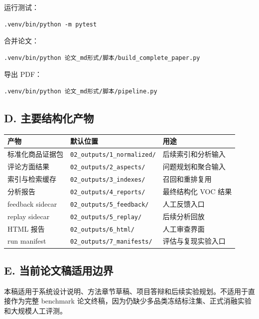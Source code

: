 \documentclass[11pt]{article}
\begin{document}
运行测试：

\begin{verbatim}
.venv/bin/python -m pytest
\end{verbatim}

合并论文：

\begin{verbatim}
.venv/bin/python 论文_md形式/脚本/build_complete_paper.py
\end{verbatim}

导出 PDF：

\begin{verbatim}
.venv/bin/python 论文_md形式/脚本/pipeline.py
\end{verbatim}

\subsection{D. 主要结构化产物}

\begin{longtable}[]{@{}lll@{}}
\toprule\noalign{}
产物 & 默认位置 & 用途 \\
\midrule\noalign{}
\endhead
\bottomrule\noalign{}
\endlastfoot
标准化商品证据包 & \texttt{02\_outputs/1\_normalized/} & 后续索引和分析输入 \\
评论方面结果 & \texttt{02\_outputs/2\_aspects/} & 问题规划和聚合输入 \\
索引与检索缓存 & \texttt{02\_outputs/3\_indexes/} & 召回和重排复用 \\
分析报告 & \texttt{02\_outputs/4\_reports/} & 最终结构化 VOC 结果 \\
feedback sidecar & \texttt{02\_outputs/5\_feedback/} & 人工反馈入口 \\
replay sidecar & \texttt{02\_outputs/5\_replay/} & 后续分析回放 \\
HTML 报告 & \texttt{02\_outputs/6\_html/} & 人工审查界面 \\
run manifest & \texttt{02\_outputs/7\_manifests/} & 评估与复现实验入口 \\
\end{longtable}

\subsection{E. 当前论文稿适用边界}

本稿适用于系统设计说明、方法章节草稿、项目答辩和后续实验规划。不适用于直接作为完整 benchmark 论文终稿，因为仍缺少多品类冻结标注集、正式消融实验和大规模人工评测。



\end{document}
